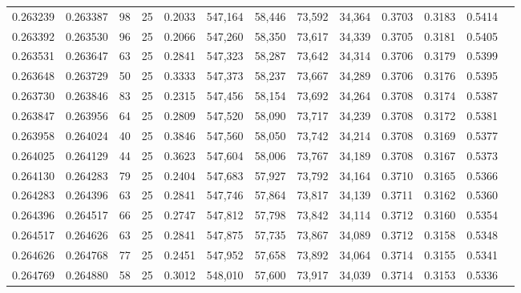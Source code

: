 \begin{tabular}{rrrrrrrrrrrrr}
0.263239 & 0.263387 &    98 &  25 &                                     0.2033 & 547,164 &  58,446 &  73,592 &  34,364 & 0.3703 & 0.3183 & 0.5414 \\
0.263392 & 0.263530 &    96 &  25 &                                     0.2066 & 547,260 &  58,350 &  73,617 &  34,339 & 0.3705 & 0.3181 & 0.5405 \\
0.263531 & 0.263647 &    63 &  25 &                                     0.2841 & 547,323 &  58,287 &  73,642 &  34,314 & 0.3706 & 0.3179 & 0.5399 \\
0.263648 & 0.263729 &    50 &  25 &                                     0.3333 & 547,373 &  58,237 &  73,667 &  34,289 & 0.3706 & 0.3176 & 0.5395 \\
0.263730 & 0.263846 &    83 &  25 &                                     0.2315 & 547,456 &  58,154 &  73,692 &  34,264 & 0.3708 & 0.3174 & 0.5387 \\
0.263847 & 0.263956 &    64 &  25 &                                     0.2809 & 547,520 &  58,090 &  73,717 &  34,239 & 0.3708 & 0.3172 & 0.5381 \\
0.263958 & 0.264024 &    40 &  25 &                                     0.3846 & 547,560 &  58,050 &  73,742 &  34,214 & 0.3708 & 0.3169 & 0.5377 \\
0.264025 & 0.264129 &    44 &  25 &                                     0.3623 & 547,604 &  58,006 &  73,767 &  34,189 & 0.3708 & 0.3167 & 0.5373 \\
0.264130 & 0.264283 &    79 &  25 &                                     0.2404 & 547,683 &  57,927 &  73,792 &  34,164 & 0.3710 & 0.3165 & 0.5366 \\
0.264283 & 0.264396 &    63 &  25 &                                     0.2841 & 547,746 &  57,864 &  73,817 &  34,139 & 0.3711 & 0.3162 & 0.5360 \\
0.264396 & 0.264517 &    66 &  25 &                                     0.2747 & 547,812 &  57,798 &  73,842 &  34,114 & 0.3712 & 0.3160 & 0.5354 \\
0.264517 & 0.264626 &    63 &  25 &                                     0.2841 & 547,875 &  57,735 &  73,867 &  34,089 & 0.3712 & 0.3158 & 0.5348 \\
0.264626 & 0.264768 &    77 &  25 &                                     0.2451 & 547,952 &  57,658 &  73,892 &  34,064 & 0.3714 & 0.3155 & 0.5341 \\
0.264769 & 0.264880 &    58 &  25 &                                     0.3012 & 548,010 &  57,600 &  73,917 &  34,039 & 0.3714 & 0.3153 & 0.5336 \\

\end{tabular}

